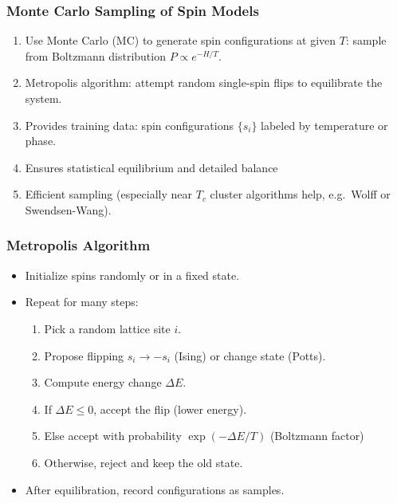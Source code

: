 \documentclass{beamer}
\begin{document}
\begin{frame}
\frametitle{Monte Carlo Sampling of Spin Models}

\begin{enumerate}
\item Use Monte Carlo (MC) to generate spin configurations at given $T$: sample from Boltzmann distribution $P\propto e^{-H/T}$.

\item Metropolis algorithm: attempt random single-spin flips to equilibrate the system.

\item Provides training data: spin configurations $\{s_i\}$ labeled by temperature or phase.

\item Ensures statistical equilibrium and detailed balance 

\item Efficient sampling (especially near $T_c$ cluster algorithms help, e.g.\ Wolff or Swendsen-Wang).
\end{enumerate}

\noindent
\end{frame}

\begin{frame}
\frametitle{Metropolis Algorithm}

\begin{itemize}
\item Initialize spins randomly or in a fixed state.

\item Repeat for many steps:
\begin{enumerate}

 \item Pick a random lattice site $i$.

 \item Propose flipping $s_i \to -s_i$ (Ising) or change state (Potts).

 \item Compute energy change $\Delta E$.

 \item If $\Delta E \le 0$, accept the flip (lower energy).

 \item Else accept with probability $\exp(-\Delta E/T)$ (Boltzmann factor) 

 \item Otherwise, reject and keep the old state.

\end{enumerate}

\noindent
\item After equilibration, record configurations as samples.
\end{itemize}

\noindent
\end{frame}
\end{document}
